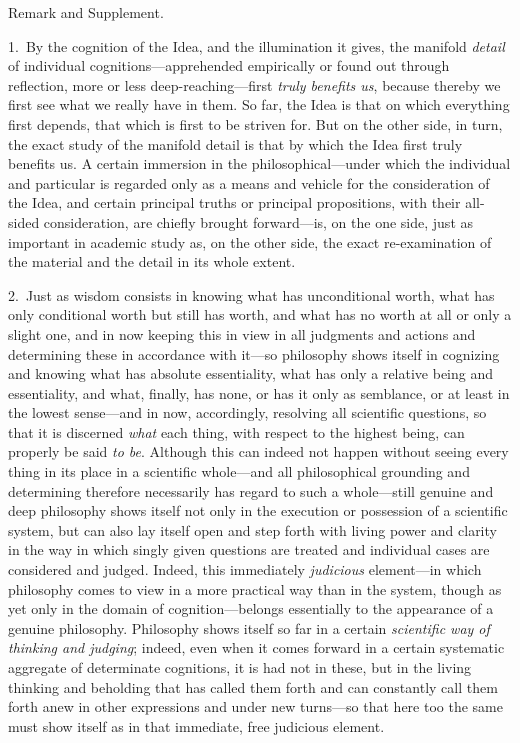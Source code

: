 \documentclass[12pt,a4paper]{book}
\begin{document}
\begin{center}Remark and Supplement.\end{center}
1.~By the cognition of the Idea, and the illumination it gives, the manifold
\emph{detail} of individual cognitions---apprehended empirically or found out through
reflection, more or less deep-reaching---first \emph{truly benefits us}, because
thereby we first see what we really have in them. So far, the Idea is that on which
everything first depends, that which is first to be striven for. But on the other side,
in turn, the exact study of the manifold detail is that by which the Idea first truly
benefits us. A certain immersion in the philosophical---under which the individual and
particular is regarded only as a means and vehicle for the consideration of the Idea,
and certain principal truths or principal propositions, with their all-sided
consideration, are chiefly brought forward---is, on the one side, just as important in
academic study as, on the other side, the exact re-examination of the material and the
detail in its whole extent.

2.~Just as wisdom consists in knowing what has unconditional worth, what has only
conditional worth but still has worth, and what has no worth at all or only a slight
one, and in now keeping this in view in all judgments and actions and determining these
in accordance with it---so philosophy shows itself in cognizing and knowing what has
absolute essentiality, what has only a relative being and essentiality, and what,
finally, has none, or has it only as semblance, or at least in the lowest sense---and
in now, accordingly, resolving all scientific questions, so that it is discerned
\emph{what} each thing, with respect to the highest being, can properly be said \emph{to
be}. Although this can indeed not happen without seeing every thing in its place in a
scientific whole---and all philosophical grounding and determining therefore
necessarily has regard to such a whole---still genuine and deep philosophy shows itself
not only in the execution or possession of a scientific system, but can also lay itself
open and step forth with living power and clarity in the way in which singly given
questions are treated and individual cases are considered and judged. Indeed, this
immediately \emph{judicious} element---in which philosophy comes to view in a more
practical way than in the system, though as yet only in the domain of cognition---belongs
essentially to the appearance of a genuine philosophy. Philosophy shows itself so far in
a certain \emph{scientific way of thinking and judging}; indeed, even when it comes
forward in a certain systematic aggregate of determinate cognitions, it is had not in
these, but in the living thinking and beholding that has called them forth and can
constantly call them forth anew in other expressions and under new turns---so that here
too the same must show itself as in that immediate, free judicious element.
\end{document}

